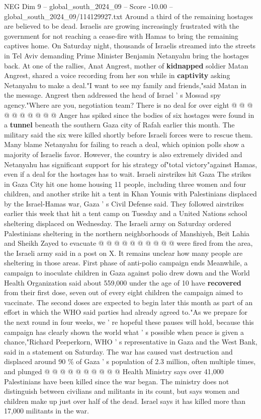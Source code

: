 \begin{textsample}{NEG Dim 9 – global\_south\_2024\_09 – Score -10.00 – global\_south\_2024\_09/114129927.txt}
Around a third of the remaining hostages are believed to be dead.
Israelis are growing increasingly frustrated with the government for not reaching a cease-fire with Hamas to bring the remaining captives home.
On Saturday night, thousands of Israelis streamed into the streets in Tel Aviv demanding Prime Minister Benjamin Netanyahu bring the hostages back.
At one of the rallies, Anat Angrest, mother of \textbf{kidnapped} soldier Matan Angrest, shared a voice recording from her son while in \textbf{captivity} asking Netanyahu to make a deal."I want to see my family and friends,"said Matan in the message.
Angrest then addressed the head of Israel ' s Mossad spy agency."Where are you, negotiation team?
There is no deal for over eight @ @ @ @ @ @ @ @ @ @ Anger has spiked since the bodies of six hostages were found in a \textbf{tunnel} beneath the southern Gaza city of Rafah earlier this month.
The military said the six were killed shortly before Israeli forces were to rescue them.
Many blame Netanyahu for failing to reach a deal, which opinion polls show a majority of Israelis favor.
However, the country is also extremely divided and Netanyahu has significant support for his strategy of"total victory"against Hamas, even if a deal for the hostages has to wait.
Israeli airstrikes hit Gaza The strikes in Gaza City hit one home housing 11 people, including three women and four children, and another strike hit a tent in Khan Younis with Palestinians displaced by the Israel-Hamas war, Gaza ' s Civil Defense said.
They followed airstrikes earlier this week that hit a tent camp on Tuesday and a United Nations school sheltering displaced on Wednesday.
The Israeli army on Saturday ordered Palestinians sheltering in the northern neighborhoods of Manshiyeh, Beit Lahia and Sheikh Zayed to evacuate @ @ @ @ @ @ @ @ @ @ were fired from the area, the Israeli army said in a post on X.
It remains unclear how many people are sheltering in those areas.
First phase of anti-polio campaign ends Meanwhile, a campaign to inoculate children in Gaza against polio drew down and the World Health Organization said about 559,000 under the age of 10 have \textbf{recovered} from their first dose, seven out of every eight children the campaign aimed to vaccinate.
The second doses are expected to begin later this month as part of an effort in which the WHO said parties had already agreed to."As we prepare for the next round in four weeks, we ' re hopeful these pauses will hold, because this campaign has clearly shown the world what ' s possible when peace is given a chance,"Richard Peeperkorn, WHO ' s representative in Gaza and the West Bank, said in a statement on Saturday.
The war has caused vast destruction and displaced around 90 \% of Gaza ' s population of 2.3 million, often multiple times, and plunged @ @ @ @ @ @ @ @ @ @ Health Ministry says over 41,000 Palestinians have been killed since the war began.
The ministry does not distinguish between civilians and militants in its count, but says women and children make up just over half of the dead.
Israel says it has killed more than 17,000 militants in the war.

\end{textsample}
